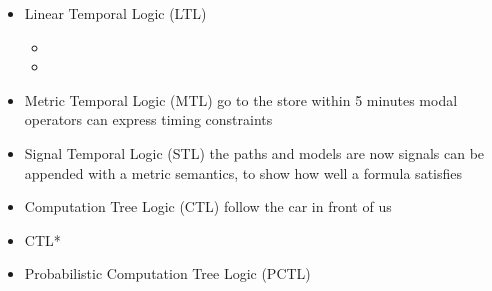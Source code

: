\documentclass{article}
\begin{document}
\begin{itemize}
\item Linear Temporal Logic (LTL)
\begin{itemize}
\item
\item
\end{itemize}
\item Metric Temporal Logic (MTL)
 go to the store within 5 minutes
 modal operators can express timing constraints
\item Signal Temporal Logic (STL)
 the paths and models are now signals
 can be appended with a metric semantics, to show how well a formula satisfies
\item Computation Tree Logic (CTL)
 follow the car in front of us
\item CTL*
\item Probabilistic Computation Tree Logic (PCTL)
\end{itemize}








\end{document}
